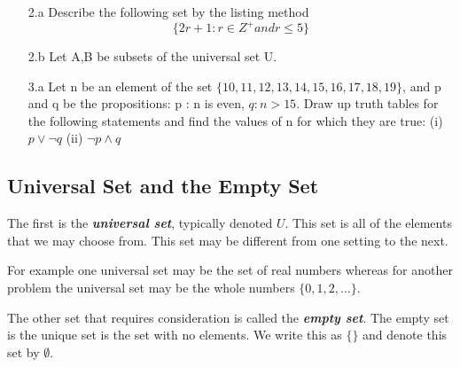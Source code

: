 \documentclass[MASTER.tex]{subfiles}
\begin{document}
\begin{itemize}
\item[2.a] Describe the following set by the listing method
\[ \{ 2r+1 : r \in Z^{+} and r \leq 5  \} \]
\item[2.b] Let A,B be subsets of the universal set U.


\end{itemize}
\begin{itemize}
\item[3.a]
Let n be an element of the set $\{10, 11, 12, 13, 14, 15, 16, 17, 18, 19\}$,
and p and q be the propositions:
p : n is even, $q : n > 15$.
Draw up truth tables for the following statements and find the values of n for
which they are true:
(i) $p \vee \neg q$
(ii) $\neg p \wedge q$
\end{itemize}


\subsection{Universal Set and the Empty Set}
The first is the \textbf{\textit{universal set}}, typically denoted $U$. This set is all of the elements that we may choose from. This set may be different from one setting to the next. 

For example one universal set may be the set of real numbers whereas for another problem the universal set may be the whole numbers $\{0, 1, 2,\ldots\}$.

The other set that requires consideration is called the \textit{\textbf{empty set}}. The empty set is the unique set is the set with no elements. We write this as $\{ \}$ and denote this set by $\emptyset$.
\end{document}
